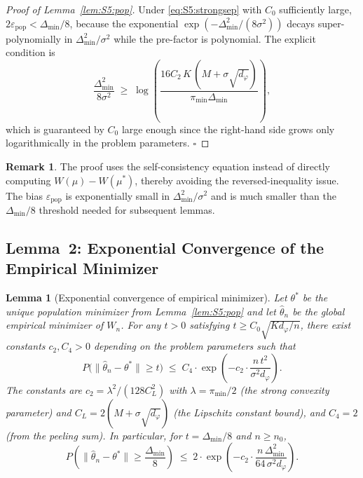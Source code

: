 \documentclass[twoside]{article}
\theoremstyle{plain}
\newtheorem{lemma}[theorem]{Lemma}
\theoremstyle{definition}
\newtheorem{remark}[theorem]{Remark}
\theoremstyle{remark}
\newcommand{\1}{\mathbf{1}}
\renewcommand{\epsilon}{\varepsilon}
\renewcommand{\phi}{\varphi}
\newcommand{\htheta}{\hat{\theta}}
\newcommand{\norm}[1]{\lVert#1\rVert}
\begin{document}
\begin{proof}[Proof of Lemma~\ref{lem:S5:pop}]
Under \eqref{eq:S5:strongsep} with $C_0$ sufficiently large,
$2\epsilon_{\mathrm{pop}}<\Delta_{\min}/8$, because the exponential
$\exp(-\Delta_{\min}^2/(8\sigma^2))$ decays super-polynomially in
$\Delta_{\min}^2/\sigma^2$ while the pre-factor is polynomial.  The
explicit condition is
\[
\frac{\Delta_{\min}^2}{8\sigma^2}\;\ge\;
\log\!\left(\frac{16C_2\,K\,(M+\sigma\sqrt{d_\phi})}
                 {\pi_{\min}\Delta_{\min}}\right),
\]
which is guaranteed by $C_0$ large enough since the right-hand side
grows only logarithmically in the problem parameters.  \hfill$\square$
\end{proof}

\begin{remark}
The proof uses the self-consistency equation instead of directly
computing $W(\mu)-W(\mu^*)$, thereby avoiding the reversed-inequality
issue.  The bias $\epsilon_{\mathrm{pop}}$ is exponentially small in
$\Delta_{\min}^2/\sigma^2$ and is much smaller than the $\Delta_{\min}/8$
threshold needed for subsequent lemmas.
\end{remark}

\subsection{Lemma~2: Exponential Convergence of the Empirical Minimizer}
\label{sec:S5:lem2}

\begin{lemma}[Exponential convergence of empirical minimizer]
\label{lem:S5:emp}
Let $\theta^*$ be the unique population minimizer from
Lemma~\ref{lem:S5:pop} and let $\htheta_n$ be the global empirical
minimizer of $W_n$.  For any $t>0$ satisfying
$t\ge C_0\sqrt{K d_\phi/n}$, there exist constants
$c_2,C_4>0$ depending on the problem parameters such that
\begin{equation}
P\bigl(\norm{\htheta_n-\theta^*}\ge t\bigr)
\;\le\; C_4\cdot\exp\!\left(-c_2\cdot\frac{n\,t^2}{\sigma^2 d_\phi}\right).
\label{eq:S5:lem2_bound}
\end{equation}
The constants are $c_2=\lambda^2/(128 C_L^2)$ with
$\lambda=\pi_{\min}/2$ (the strong convexity parameter) and
$C_L=2(M+\sigma\sqrt{d_\phi})$ (the Lipschitz constant bound), and
$C_4=2$ (from the peeling sum).  In particular, for $t=\Delta_{\min}/8$
and $n\ge n_0$,
\[
P\!\left(\norm{\htheta_n-\theta^*}\ge\frac{\Delta_{\min}}{8}\right)
\;\le\; 2\cdot\exp\!\left(
          -c_2\cdot\frac{n\,\Delta_{\min}^2}{64\,\sigma^2 d_\phi}\right).
\]
\end{lemma}
\end{document}
